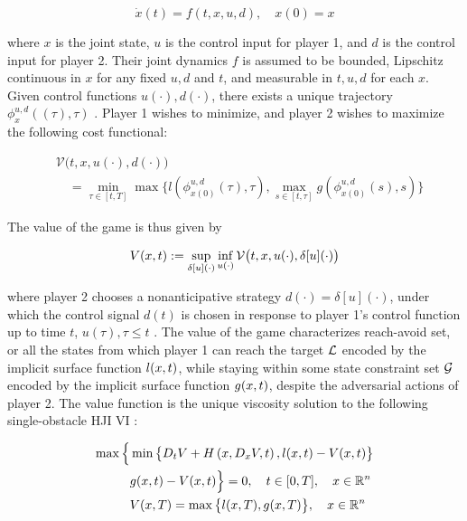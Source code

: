 \begin{equation}
\dot{x}(t) = f(t, x, u, d), \quad x(0) = x
\end{equation}

\noindent where $x$ is the joint state, $u$ is the control input for player 1, and $d$ is the control input for player 2. Their joint dynamics $f$ is assumed to be bounded, Lipschitz continuous in $x$ for any fixed $u,d$ and $t$, and measurable in $t,u,d$ for each $x$. Given control functions $u(\cdot), d(\cdot)$, there exists a unique trajectory $\phi_x^{u,d}((\tau),\tau)$ \cite{coddington55}. Player 1 wishes to minimize, and player 2 wishes to maximize the following cost functional:

\begin{equation}
\begin{aligned}
&\mathcal{V}\big(t,x,u(\cdot),d(\cdot)\big) \\
&\quad = \min_{\tau\in[t,T]}\max\big\{l(\phi_{x(0)}^{u,d}(\tau),\tau),\max_{s\in[t,\tau]} g(\phi_{x(0)}^{u,d}(s),s)\big\}
\end{aligned}
\end{equation}

The value of the game is thus given by

\begin{equation}
\begin{aligned}
V(x,t):=\sup_{\delta[u](\cdot)}\inf_{u(\cdot)}\mathcal{V}\big(t,x,u(\cdot),\delta[u](\cdot)\big)
\end{aligned}
\end{equation}

\noindent where player 2 chooses a nonanticipative strategy $d(\cdot) = \delta[u](\cdot)$, under which the control signal $d(t)$ is chosen in response to player 1's control function up to time $t$, $u(\tau),\tau\le t$ \cite{mitchell-thesis}. The value of the game characterizes reach-avoid set, or all the states from which player 1 can reach the target $\mathcal{L}$ encoded by the implicit surface function $l(x,t)$, while staying within some state constraint set $\mathcal{G}$ encoded by the implicit surface function $g(x,t)$, despite the adversarial actions of player 2. The value function is the unique viscosity solution \cite{crandall84} to the following single-obstacle HJI VI \cite{fisac15}:

\begin{equation}
\label{eq:HJIVI_full}
\begin{aligned}
\max\Big\{&\min\big\{D_t V + H\left(x, D_x V,t\right),l(x,t)-V(x, t)\big\}\\
& g(x,t)-V(x,t)\Big\}=0, \quad t\in[0,T], \quad x\in\mathbb{R}^n\\
&V(x,T) = \max\big\{l(x,T),g(x,T)\big\},  \quad x\in\mathbb{R}^n
\end{aligned}
\end{equation}

